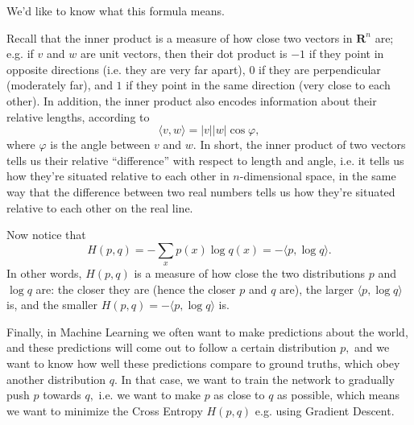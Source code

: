 \documentclass[17pt]{extarticle}
\theoremstyle{plain}
\theoremstyle{definition}
\theoremstyle{remark}
\newcommand{\bR}{\mathbf R}
\newcommand{\0}{\varnothing}
\newcommand{\f}{\varphi}
\newcommand{\<}{\langle}
\renewcommand{\>}{\rangle}
\begin{document}
We'd like to know what this formula means.

Recall that the inner product is a measure of how close two vectors in $ \bR^n $ are; e.g. if $ v $ and $ w $ are unit vectors, then their dot product is $ -1 $ if they point in opposite directions (i.e. they are very far apart), $ 0 $ if they are perpendicular (moderately far), and $ 1 $ if they point in the same direction (very close to each other). In addition, the inner product also encodes information about their relative lengths, according to \[
\< v, w \> = | v | | w | \cos \f,
\]
where $ \f $ is the angle between $ v $ and $ w. $ In short, the inner product of two vectors tells us their relative ``difference'' with respect to length and angle, i.e. it tells us how they're situated relative to each other in $ n $-dimensional space, in the same way that the difference between two real numbers tells us how they're situated relative to each other on the real line.

Now notice that \[
H(p, q) = - \sum_x p(x) \log q(x) = - \< p, \log q \>.
\]
In other words, $ H(p, q) $ is a measure of how close the two distributions $ p $ and $ \log q $ are: the closer they are (hence the closer $ p $ and $ q $ are), the larger $ \< p, \log q \> $ is, and the smaller $ H(p, q) = - \< p, \log q \> $ is.

Finally, in Machine Learning we often want to make predictions about the world, and these predictions will come out to follow a certain distribution $ p, $ and we want to know how well these predictions compare to ground truths, which obey another distribution $ q. $ In that case, we want to train the network to gradually push $ p $ towards $ q, $ i.e. we want to make $ p $ as close to $ q $ as possible, which means we want to minimize the Cross Entropy $ H(p, q) $ e.g. using Gradient Descent.
\end{document}
